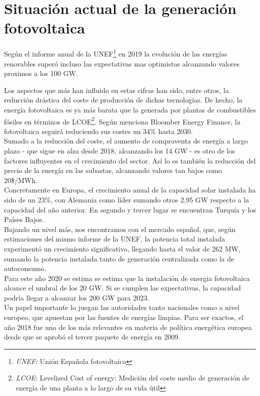 
\section{Situación actual de la generación fotovoltaica}
Según el informe anual de la UNEF\footnote{\textit{UNEF}: Unión Española fotovoltaica} en 2019\cite{unef_2019} la evolución de las energías renovables superó incluso las expectativas mas optimistas alcanzando valores proximos a los 100 GW.

Los aspectos que más han influido en estas cifras han sido, entre otros, la reducción drástica del coste de producción de dichas tecnologías. De hecho, la energía fotovoltaica es ya más barata que la generada por plantas de combustibles fósiles en términos de LCOE\footnote{\textit{LCOE}: Levelized Cost of energy: Medición del coste medio de generación de energía de una planta a lo largo de su vida útil }. Según menciona Bloomber Energy Finance, la fotovoltaica seguirá reduciendo sus costes un 34\% hasta 2030.\\

Sumado a la reducción del coste, el aumento de compraventa de energía a largo plazo - que sigue en alza desde 2018, alcanzando los 14 GW - es otro de los factores influyentes en el crecimiento del sector. Así lo es también la reducción del precio de la energía en las subastas, alcanzando valores tan bajos como 20\$/MWh.\\

Concretamente en Europa, el crecimiento anual de la capacidad solar instalada ha sido de un 23\%, con Alemania como líder sumando otros 2,95 GW respecto a la capacidad del año anterior. En segundo y tercer lugar se encuentran Turquía y los Países Bajos.\\

Bajando un nivel más, nos encontramos con el mercado español, que, según estimaciones del mismo informe de la UNEF, la potencia total instalada experimentó un crecimiento significativo, llegando hasta el valor de 262 MW, sumando la potencia instalada tanto de generación centralizada como la de autoconsumo.\\

Para este año 2020 se estima se estima que la instalación de energia fotovoltaica alcance el umbral de los 20 GW. Si se cumplen las expectativas, la capacidad podría llegar a alcanzar los 200 GW para 2023.\\

Un papel importante lo juegan las autoridades tanto nacionales como a nivel europeo, que apuestan por las fuentes de energías limpias. Para ser exactos, el año 2018 fue uno de los más relevantes en materia de política energética europea desde que se aprobó el tercer paquete de energía en 2009.

